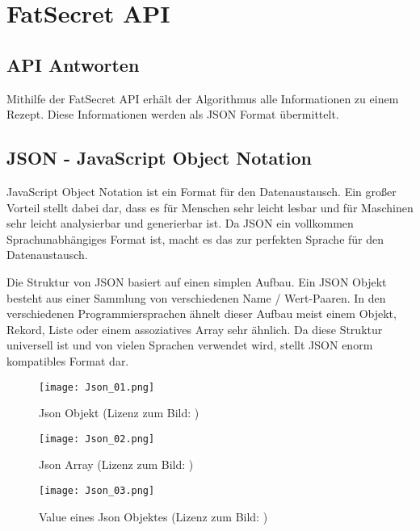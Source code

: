 
\section{FatSecret API}

\subsection{API Antworten}

Mithilfe der FatSecret\cite{FatSecretAPI} API erhält der Algorithmus alle Informationen zu einem Rezept. Diese Informationen werden als JSON Format übermittelt. 

\subsection{JSON - JavaScript Object Notation}

JavaScript\cite{JSON} Object Notation ist ein Format für den Datenaustausch. Ein großer Vorteil stellt dabei dar, dass es für Menschen sehr leicht lesbar und für Maschinen sehr leicht analysierbar und generierbar ist. Da JSON ein vollkommen Sprachunabhängiges Format ist, macht es das zur perfekten Sprache für den Datenaustausch.

Die Struktur von JSON basiert auf einen simplen Aufbau. Ein JSON Objekt besteht aus einer Sammlung von verschiedenen Name / Wert-Paaren. In den verschiedenen Programmiersprachen ähnelt dieser Aufbau meist einem Objekt, Rekord, Liste oder einem assoziatives Array sehr ähnlich. Da diese Struktur universell ist und von vielen Sprachen verwendet wird, stellt JSON enorm kompatibles Format dar.

\begin{figure}[H] 
\centering 
\texttt{[image: Json\_01.png]} 
\caption{Json Objekt (Lizenz zum Bild: \cite{JsonObjectBild})} 
\end{figure}

\begin{figure}[H] 
\centering 
\texttt{[image: Json\_02.png]} 
\caption{Json Array (Lizenz zum Bild: \cite{JsonArrayBild})} 
\end{figure}

\begin{figure}[H] 
\centering 
\texttt{[image: Json\_03.png]} 
\caption{Value eines Json Objektes (Lizenz zum Bild: \cite{JsonValueBild})} 
\end{figure}

